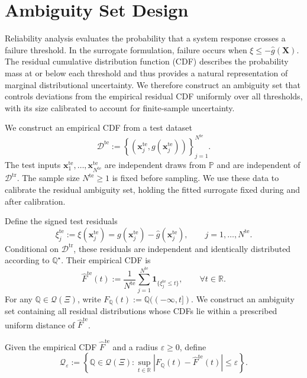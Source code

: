 \documentclass[review,11pt,3p,authoryear,nopreprintline]{elsarticle}
\begin{document}
\section{Ambiguity Set Design}
\label{sec-ambiguity-set}

Reliability analysis evaluates the probability that a system response crosses a failure threshold. In the surrogate formulation, failure occurs when $\xi\le-\hat g(\bm X)$. The residual cumulative distribution function (CDF) describes the probability mass at or below each threshold and thus provides a natural representation of marginal distributional uncertainty. We therefore construct an ambiguity set that controls deviations from the empirical residual CDF uniformly over all thresholds, with its size calibrated to account for finite-sample uncertainty.

We construct an empirical CDF from a test dataset
\[
  \mathcal D^{\mathrm{te}}:=\left\{\left(\bm x_j^{\mathrm{te}},g(\bm x_j^{\mathrm{te}})\right)\right\}_{j=1}^{N^{\mathrm{te}}}.
\]
The test inputs $\bm x_1^{\mathrm{te}},\ldots,\bm x_{N^{\mathrm{te}}}^{\mathrm{te}}$ are independent draws from $\mathbb P$ and are independent of $\mathcal D^{\mathrm{tr}}$. The sample size $N^{\mathrm{te}}\ge1$ is fixed before sampling. We use these data to calibrate the residual ambiguity set, holding the fitted surrogate fixed during and after calibration.

Define the signed test residuals
\[
  \xi_j^{\mathrm{te}}:=\xi(\bm x_j^{\mathrm{te}})=g(\bm x_j^{\mathrm{te}})-\hat g(\bm x_j^{\mathrm{te}}),\qquad j=1,\ldots,N^{\mathrm{te}}.
\]
Conditional on $\mathcal D^{\mathrm{tr}}$, these residuals are independent and identically distributed according to $\mathbb Q^\star$. Their empirical CDF is
\begin{equation}
  \widehat F^{\mathrm{te}}(t):=\frac{1}{N^{\mathrm{te}}}\sum_{j=1}^{N^{\mathrm{te}}}\mathbf 1_{\{\xi_j^{\mathrm{te}}\le t\}},\qquad \forall t\in\mathbb R.
  \label{eq-empirical-cdf}
\end{equation}
For any $\mathbb Q\in\mathcal Q(\Xi)$, write $F_{\mathbb Q}(t):=\mathbb Q(({-\infty},t])$. We construct an ambiguity set containing all residual distributions whose CDFs lie within a prescribed uniform distance of $\widehat F^{\mathrm{te}}$.

\begin{definition}
  Given the empirical CDF $\widehat F^{\mathrm{te}}$ and a radius $\varepsilon\ge0$, define
  \begin{equation}
    \mathscr Q_\varepsilon:=\left\{\mathbb Q\in\mathcal Q(\Xi):\sup_{t\in\mathbb R}\left|F_{\mathbb Q}(t)-\widehat F^{\mathrm{te}}(t)\right|\le\varepsilon\right\}.
    \label{eq-cdf-ambiguity-set}
  \end{equation}
\end{definition}
\end{document}
